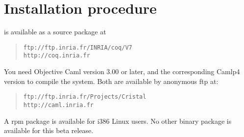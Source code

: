 \documentclass[11pt]{article}
\begin{document}
\section{Installation procedure}


{\Coq} is available as a source package at 

\begin{quote}
\verb|ftp://ftp.inria.fr/INRIA/coq/V7|\\
\verb|http://coq.inria.fr|
\end{quote}

You need Objective Caml version 3.00 or later, and the corresponding 
Camlp4 version to compile the system. Both are available by anonymous ftp
at:

\begin{quote}
\verb|ftp://ftp.inria.fr/Projects/Cristal|\\
\verb|http://caml.inria.fr|
\end{quote}

\noindent
%

A rpm package is available for i386 Linux users. No other binary
package is available for this beta release.

%

%
%
\end{document}
